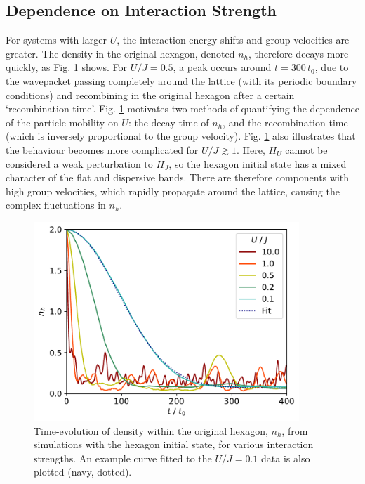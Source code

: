 \subsection{Dependence on Interaction Strength}\label{Sec:HexagonQuantitative}

For systems with larger $U$, the interaction energy shifts and group velocities are greater. The density in the original hexagon, denoted $n_{h}$, therefore decays more quickly, as Fig. \ref{Fig:Original_Hexagon_Density} shows. For $U/J=0.5$, a peak occurs around $t=300\,t_0$, due to the wavepacket passing completely around the lattice (with its periodic boundary conditions) and recombining in the original hexagon after a certain `recombination time'. Fig. \ref{Fig:Original_Hexagon_Density} motivates two methods of quantifying the dependence of the particle mobility on $U$: the decay time of $n_{h}$, and the recombination time (which is inversely proportional to the group velocity). Fig. \ref{Fig:Original_Hexagon_Density} also illustrates that the behaviour becomes more complicated for $U/J\gtrsim 1$. Here, $H_U$ cannot be considered a weak perturbation to $H_J$, so the hexagon initial state has a mixed character of the flat and dispersive bands. There are therefore components with high group velocities, which rapidly propagate around the lattice, causing the complex fluctuations in $n_{h}$.

\newpage

\begin{figure}[ht!]
    \centering
    \includegraphics[width=10cm]{Figures/Original_Hexagon_Density}
    \caption{Time-evolution of density within the original hexagon, $n_{h}$, from simulations with the hexagon initial state, for various interaction strengths. An example curve fitted to the $U/J=0.1$ data is also plotted (navy, dotted).}
    \label{Fig:Original_Hexagon_Density}
\end{figure}

